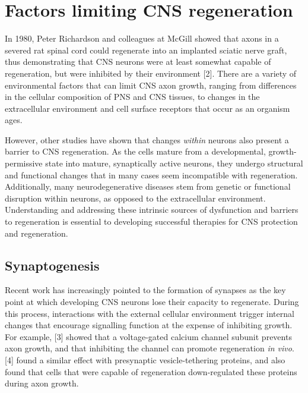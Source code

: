 \documentclass[
  12pt,
  a4paper,
]{book}
\begin{document}
\hypertarget{factors-limiting-cns-regeneration}{%
\section{Factors limiting CNS regeneration}\label{factors-limiting-cns-regeneration}}

In 1980, Peter Richardson and colleagues at McGill showed that axons in a severed rat spinal cord could regenerate into an implanted sciatic nerve graft, thus demonstrating that CNS neurons were at least somewhat capable of regeneration, but were inhibited by their environment {[}2{]}. There are a variety of environmental factors that can limit CNS axon growth, ranging from differences in the cellular composition of PNS and CNS tissues, to changes in the extracellular environment and cell surface receptors that occur as an organism ages.

However, other studies have shown that changes \emph{within} neurons also present a barrier to CNS regeneration. As the cells mature from a developmental, growth-permissive state into mature, synaptically active neurons, they undergo structural and functional changes that in many cases seem incompatible with regeneration. Additionally, many neurodegenerative diseases stem from genetic or functional disruption within neurons, as opposed to the extracellular environment. Understanding and addressing these intrinsic sources of dysfunction and barriers to regeneration is essential to developing successful therapies for CNS protection and regeneration.

\hypertarget{synaptogenesis}{%
\subsection{Synaptogenesis}\label{synaptogenesis}}

Recent work has increasingly pointed to the formation of synapses as the key point at which developing CNS neurons lose their capacity to regenerate. During this process, interactions with the external cellular environment trigger internal changes that encourage signalling function at the expense of inhibiting growth. For example, {[}3{]} showed that a voltage-gated calcium channel subunit prevents axon growth, and that inhibiting the channel can promote regeneration \emph{in vivo}. {[}4{]} found a similar effect with presynaptic vesicle-tethering proteins, and also found that cells that were capable of regeneration down-regulated these proteins during axon growth.
\end{document}
